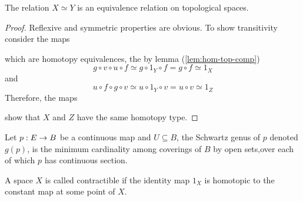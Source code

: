 \begin{lem}
    The relation $X \simeq Y$ is an equivalence relation on topological spaces.
\end{lem}

\begin{proof}
    Reflexive and symmetric properties are obvious.
        To show transitivity consider the maps
    \begin{center}
        \qquad
    \end{center}
    which are homotopy equivalences, the by lemma (\ref{lem:hom-top-comp})
    \[
        g \circ v \circ u \circ f \simeq g \circ 1_Y \circ f = g \circ f \simeq 1_X
    \]
    and
    \[
        u \circ f \circ g \circ v \simeq u \circ 1_Y \circ v = u \circ v \simeq 1_Z
    \]
    Therefore, the maps
    \begin{center}
    \end{center}
    show that $X$ and $Z$ have the same homotopy type.
\end{proof}

\begin{defn}
    Let $p : E \rightarrow B$ be a continuous map and $U \subseteq B$, the Schwartz genus of $p$ denoted $g(p)$, is the minimum cardinality among coverings of $B$ by open sets,over each of which $p$ has continuous section.
\end{defn}

\begin{defn}
    A space $X$ is called contractible if the identity map $1_X$ is homotopic to the constant map at some point of $X$.
\end{defn}

